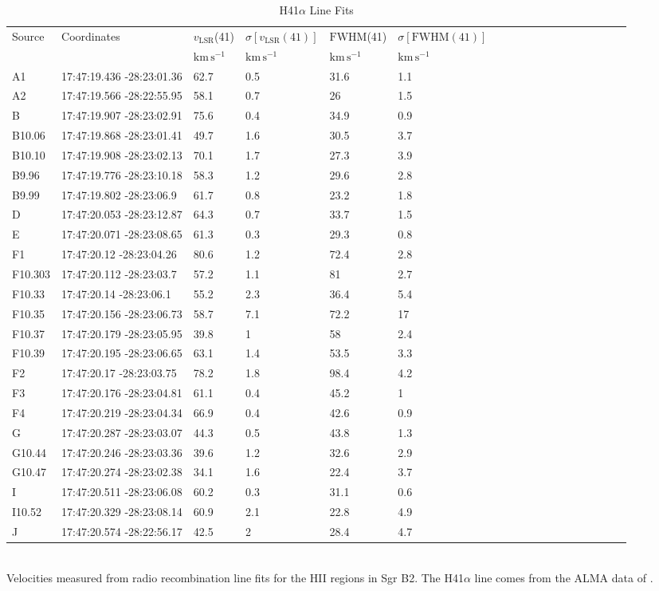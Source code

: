 \begin{table}[htp]
\caption{H41$\alpha$ Line Fits}
\begin{minipage}{130mm}
\begin{tabular}{llllllllllllllllll}
\label{tab:h41afits}
Source & Coordinates & $v_\mathrm{LSR}$(41) & $\sigma[v_\mathrm{LSR}(41)]$ & $\mathrm{FWHM}$(41) & $\sigma[\mathrm{FWHM}(41)]$ \\
 &  & $\mathrm{km\,s^{-1}}$ & $\mathrm{km\,s^{-1}}$ & $\mathrm{km\,s^{-1}}$ & $\mathrm{km\,s^{-1}}$ \\
\hline
A1 & 17:47:19.436 -28:23:01.36 & 62.7 & 0.5 & 31.6 & 1.1 \\
A2 & 17:47:19.566 -28:22:55.95 & 58.1 & 0.7 & 26 & 1.5 \\
B & 17:47:19.907 -28:23:02.91 & 75.6 & 0.4 & 34.9 & 0.9 \\
B10.06 & 17:47:19.868 -28:23:01.41 & 49.7 & 1.6 & 30.5 & 3.7 \\
B10.10 & 17:47:19.908 -28:23:02.13 & 70.1 & 1.7 & 27.3 & 3.9 \\
B9.96 & 17:47:19.776 -28:23:10.18 & 58.3 & 1.2 & 29.6 & 2.8 \\
B9.99 & 17:47:19.802 -28:23:06.9 & 61.7 & 0.8 & 23.2 & 1.8 \\
D & 17:47:20.053 -28:23:12.87 & 64.3 & 0.7 & 33.7 & 1.5 \\
E & 17:47:20.071 -28:23:08.65 & 61.3 & 0.3 & 29.3 & 0.8 \\
F1 & 17:47:20.12 -28:23:04.26 & 80.6 & 1.2 & 72.4 & 2.8 \\
F10.303 & 17:47:20.112 -28:23:03.7 & 57.2 & 1.1 & 81 & 2.7 \\
F10.33 & 17:47:20.14 -28:23:06.1 & 55.2 & 2.3 & 36.4 & 5.4 \\
F10.35 & 17:47:20.156 -28:23:06.73 & 58.7 & 7.1 & 72.2 & 17 \\
F10.37 & 17:47:20.179 -28:23:05.95 & 39.8 & 1 & 58 & 2.4 \\
F10.39 & 17:47:20.195 -28:23:06.65 & 63.1 & 1.4 & 53.5 & 3.3 \\
F2 & 17:47:20.17 -28:23:03.75 & 78.2 & 1.8 & 98.4 & 4.2 \\
F3 & 17:47:20.176 -28:23:04.81 & 61.1 & 0.4 & 45.2 & 1 \\
F4 & 17:47:20.219 -28:23:04.34 & 66.9 & 0.4 & 42.6 & 0.9 \\
G & 17:47:20.287 -28:23:03.07 & 44.3 & 0.5 & 43.8 & 1.3 \\
G10.44 & 17:47:20.246 -28:23:03.36 & 39.6 & 1.2 & 32.6 & 2.9 \\
G10.47 & 17:47:20.274 -28:23:02.38 & 34.1 & 1.6 & 22.4 & 3.7 \\
I & 17:47:20.511 -28:23:06.08 & 60.2 & 0.3 & 31.1 & 0.6 \\
I10.52 & 17:47:20.329 -28:23:08.14 & 60.9 & 2.1 & 22.8 & 4.9 \\
J & 17:47:20.574 -28:22:56.17 & 42.5 & 2 & 28.4 & 4.7 \\
\hline
\end{tabular}\\
Velocities measured from radio recombination line fits for the HII regions in Sgr B2.  The H41$\alpha$ line comes from the ALMA data of \citet{Ginsburg2018a}.
\end{minipage}
\end{table}
